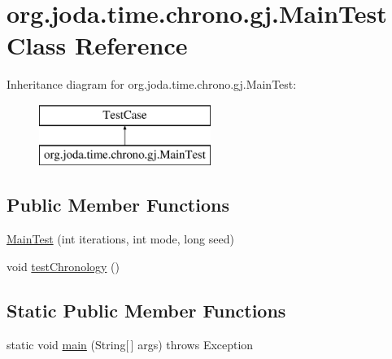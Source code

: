 \hypertarget{classorg_1_1joda_1_1time_1_1chrono_1_1gj_1_1_main_test}{\section{org.\-joda.\-time.\-chrono.\-gj.\-Main\-Test Class Reference}
\label{classorg_1_1joda_1_1time_1_1chrono_1_1gj_1_1_main_test}
}
Inheritance diagram for org.\-joda.\-time.\-chrono.\-gj.\-Main\-Test\-:\begin{figure}[H]
\begin{center}
\leavevmode
\includegraphics[height=2.000000cm]{classorg_1_1joda_1_1time_1_1chrono_1_1gj_1_1_main_test}
\end{center}
\end{figure}
\subsection*{Public Member Functions}
\begin{DoxyCompactItemize}
\item 
\hyperlink{classorg_1_1joda_1_1time_1_1chrono_1_1gj_1_1_main_test_a812b38254d55b865dfa653fdef69cc7c}{Main\-Test} (int iterations, int mode, long seed)
\item 
void \hyperlink{classorg_1_1joda_1_1time_1_1chrono_1_1gj_1_1_main_test_a2992d87d57dc1e72a45ce9b2cbd4ed89}{test\-Chronology} ()
\end{DoxyCompactItemize}
\subsection*{Static Public Member Functions}
\begin{DoxyCompactItemize}
\item 
static void \hyperlink{classorg_1_1joda_1_1time_1_1chrono_1_1gj_1_1_main_test_a9ee40d650d57992fc98ac2ab3b4e1c1d}{main} (String\mbox{[}$\,$\mbox{]} args)  throws Exception 
\end{DoxyCompactItemize}
